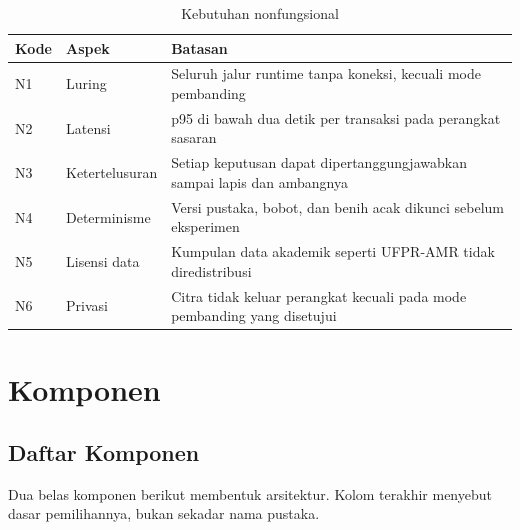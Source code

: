 \documentclass[12pt,a4paper,oneside]{report}
\newcommand{\parencite}[1]{\citep{#1}}
\begin{document}
\begin{table}[H]
\caption{Kebutuhan nonfungsional}
\label{tab:nonfungsional}
\begin{tabularx}{\textwidth}{@{}L{1.1cm} L{4.6cm} X@{}}
\toprule
\textbf{Kode} & \textbf{Aspek} & \textbf{Batasan} \\
\midrule
N1 & Luring & Seluruh jalur runtime tanpa koneksi, kecuali mode pembanding \\
N2 & Latensi & p95 di bawah dua detik per transaksi pada perangkat sasaran \\
N3 & Ketertelusuran & Setiap keputusan dapat dipertanggungjawabkan sampai lapis dan ambangnya \\
N4 & Determinisme & Versi pustaka, bobot, dan benih acak dikunci sebelum eksperimen \\
N5 & Lisensi data & Kumpulan data akademik seperti UFPR-AMR tidak diredistribusi \parencite{laroca2019convolutional} \\
N6 & Privasi & Citra tidak keluar perangkat kecuali pada mode pembanding yang disetujui \\
\bottomrule
\end{tabularx}
\end{table}

\chapter{Komponen}

\section{Daftar Komponen}

Dua belas komponen berikut membentuk arsitektur. Kolom terakhir menyebut dasar
pemilihannya, bukan sekadar nama pustaka.
\end{document}
